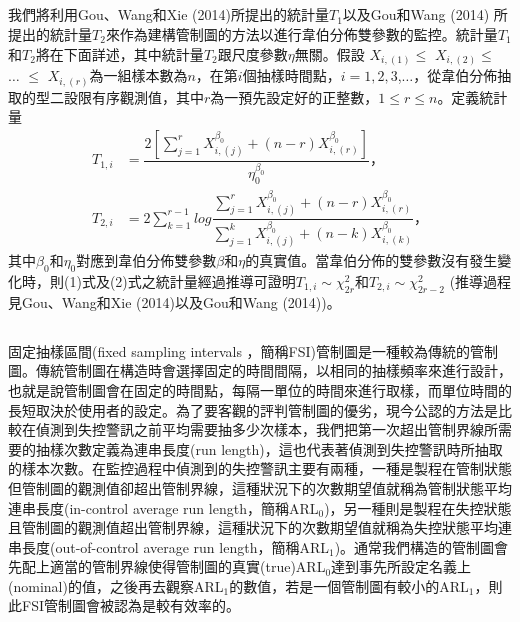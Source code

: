 \documentclass[12pt]{article}  %
\theoremstyle{plain}
\begin{document}
\subsection{}
我們將利用Gou、Wang和Xie (2014)所提出的統計量$T_1$以及Gou和Wang (2014) 所提出的統計量$T_2$來作為建構管制圖的方法以進行韋伯分佈雙參數的監控。統計量$T_1$和$T_2$將在下面詳述，其中統計量$T_2$跟尺度參數$\eta$無關。假設
$X_{i,\left( 1\right)}\leq$ $X_{i,\left( 2\right)}\leq$ $\ldots$ $\leq$ $X_{i,\left( r\right)}$為一組樣本數為$n$，在第$i$個抽樣時間點，$i=1,2,3$,$\ldots$，從韋伯分佈抽取的型二設限有序觀測值，其中$r$為一預先設定好的正整數，$1\leq r\leq n$。定義統計量
\begin{align}
T_{1,i} &= \dfrac{2\left [\sum^{r}_{j=1}X^{\beta _{0}}_{i,\left( j\right)}+\left( n-r\right)X^{\beta _{0}}_{i,\left( r\right)}\right ]}{\eta ^{\beta_0}_{0}} \mbox{，}\\
T_{2,i} &= 2\sum^{r-1}_{k=1}log\dfrac{\sum^{r}_{j=1}X^{\beta _{0}}_{i,\left( j\right)}+\left( n-r\right)X^{\beta _{0}}_{i,\left( r\right)}}{\sum^{k}_{j=1}X^{\beta _{0}}_{i,\left( j\right)}+\left( n-k\right)X^{\beta _{0}}_{i,\left( k\right)}}\mbox{，}
\end{align}
其中$\beta_0$和$\eta_0$對應到韋伯分佈雙參數$\beta$和$\eta$的真實值。當韋伯分佈的雙參數沒有發生變化時，則(1)式及(2)式之統計量經過推導可證明$T_{1,i}\sim\chi^2_{2r}$和$T_{2,i}\sim\chi^2_{2r-2}$ (推導過程見Gou、Wang和Xie (2014)以及Gou和Wang (2014))。


\subsection{}
固定抽樣區間(fixed sampling intervals ，簡稱FSI)管制圖是一種較為傳統的管制圖。傳統管制圖在構造時會選擇固定的時間間隔，以相同的抽樣頻率來進行設計，也就是說管制圖會在固定的時間點，每隔一單位的時間來進行取樣，而單位時間的長短取決於使用者的設定。為了要客觀的評判管制圖的優劣，現今公認的方法是比較在偵測到失控警訊之前平均需要抽多少次樣本，我們把第一次超出管制界線所需要的抽樣次數定義為連串長度(run length)，這也代表著偵測到失控警訊時所抽取的樣本次數。在監控過程中偵測到的失控警訊主要有兩種，一種是製程在管制狀態但管制圖的觀測值卻超出管制界線，這種狀況下的次數期望值就稱為管制狀態平均連串長度(in-control average run length，簡稱ARL$_0$)，另一種則是製程在失控狀態且管制圖的觀測值超出管制界線，這種狀況下的次數期望值就稱為失控狀態平均連串長度(out-of-control average run length，簡稱ARL$_1$)。通常我們構造的管制圖會先配上適當的管制界線使得管制圖的真實(true)ARL$_0$達到事先所設定名義上(nominal)的值，之後再去觀察ARL$_1$的數值，若是一個管制圖有較小的ARL$_1$，則此FSI管制圖會被認為是較有效率的。
\end{document}
